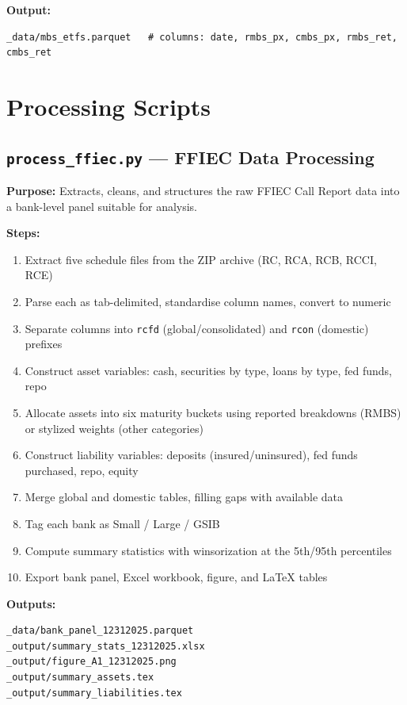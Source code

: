 \documentclass[12pt, a4paper]{article}
\begin{document}
\textbf{Output:}
\begin{lstlisting}
_data/mbs_etfs.parquet   # columns: date, rmbs_px, cmbs_px, rmbs_ret, cmbs_ret
\end{lstlisting}

\section{Processing Scripts}

\subsection{\texttt{process\_ffiec.py} --- FFIEC Data Processing}

\textbf{Purpose:} Extracts, cleans, and structures the raw FFIEC Call Report
data into a bank-level panel suitable for analysis.

\textbf{Steps:}
\begin{enumerate}[noitemsep]
    \item Extract five schedule files from the ZIP archive (RC, RCA, RCB, RCCI, RCE)
    \item Parse each as tab-delimited, standardise column names, convert to numeric
    \item Separate columns into \texttt{rcfd} (global/consolidated) and
          \texttt{rcon} (domestic) prefixes
    \item Construct asset variables: cash, securities by type, loans by type,
          fed funds, repo
    \item Allocate assets into six maturity buckets using reported breakdowns
          (RMBS) or stylized weights (other categories)
    \item Construct liability variables: deposits (insured/uninsured), fed funds
          purchased, repo, equity
    \item Merge global and domestic tables, filling gaps with available data
    \item Tag each bank as Small / Large / GSIB
    \item Compute summary statistics with winsorization at the 5th/95th percentiles
    \item Export bank panel, Excel workbook, figure, and LaTeX tables
\end{enumerate}

\textbf{Outputs:}
\begin{lstlisting}
_data/bank_panel_12312025.parquet
_output/summary_stats_12312025.xlsx
_output/figure_A1_12312025.png
_output/summary_assets.tex
_output/summary_liabilities.tex
\end{lstlisting}
\end{document}
